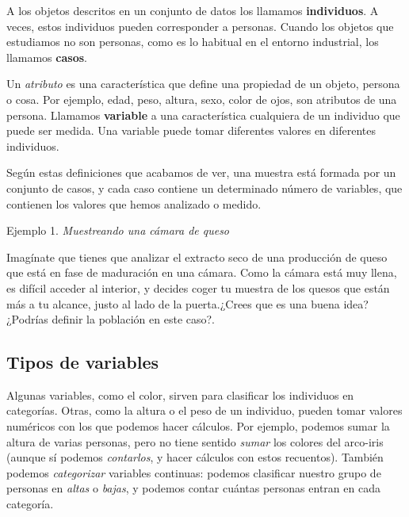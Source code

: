 \documentclass[
  letterpaper,
]{scrbook}
\begin{document}
A los objetos descritos en un conjunto de datos los llamamos
\textbf{individuos}. A veces, estos individuos pueden corresponder a
personas. Cuando los objetos que estudiamos no son personas, como es lo
habitual en el entorno industrial, los llamamos \textbf{casos}.

Un \emph{atributo} es una característica que define una propiedad de un
objeto, persona o cosa. Por ejemplo, edad, peso, altura, sexo, color de
ojos, son atributos de una persona. Llamamos \textbf{variable} a una
característica cualquiera de un individuo que puede ser medida. Una
variable puede tomar diferentes valores en diferentes individuos.

Según estas definiciones que acabamos de ver, una muestra está formada
por un conjunto de casos, y cada caso contiene un determinado número de
variables, que contienen los valores que hemos analizado o medido.

{}

\begin{cajaverde}{Ejemplo 1. \emph{Muestreando una cámara de queso}}

 Imagínate que tienes que analizar el extracto seco de una producción de queso que está en fase de maduración en una cámara. Como la cámara está muy llena, es difícil acceder al interior, y decides coger tu muestra de los quesos que están más a tu alcance, justo al lado de la puerta.¿Crees que es una buena idea? ¿Podrías definir la población en este caso?.

\end{cajaverde}

\hypertarget{tipos-de-variables}{%
\subsection{Tipos de variables}\label{tipos-de-variables}}

Algunas variables, como el color, sirven para clasificar los individuos
en categorías. Otras, como la altura o el peso de un individuo, pueden
tomar valores numéricos con los que podemos hacer cálculos. Por ejemplo,
podemos sumar la altura de varias personas, pero no tiene sentido
\emph{sumar} los colores del arco-iris (aunque sí podemos
\emph{contarlos}, y hacer cálculos con estos recuentos). También podemos
\emph{categorizar} variables continuas: podemos clasificar nuestro grupo
de personas en \emph{altas} o \emph{bajas}, y podemos contar cuántas
personas entran en cada categoría.
\end{document}
